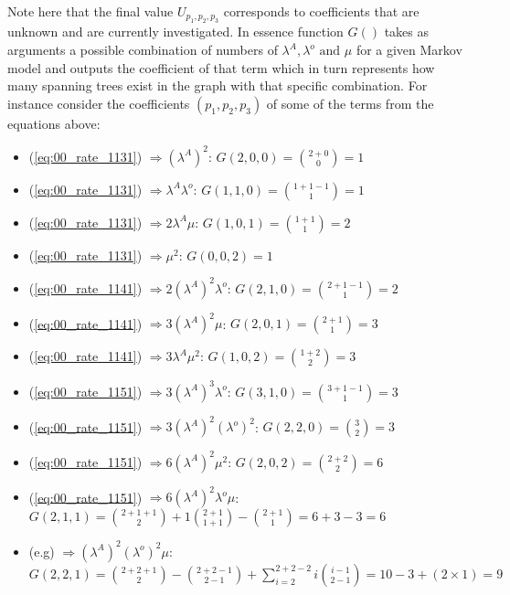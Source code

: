 Note here that the final value \(U_{p_1,p_2,p_3}\) corresponds to coefficients that are unknown and are currently investigated. 
In essence function \(G()\) takes as arguments a possible combination of numbers of \(\lambda^A, \lambda^o \text{ and } \mu \) for a given Markov model and outputs the coefficient of that term which in turn represents how many spanning trees exist in the graph with that specific combination. 
For instance consider the coefficients \((p_1,p_2,p_3)\) of some of the terms from the equations above:

\begin{multicols}{2}
    \begin{itemize}
        \item (\ref{eq:00_rate_1131}) \( \Rightarrow (\lambda^A)^2\): \(G(2,0,0) = \binom{2+0}{0} = 1\)
        \item (\ref{eq:00_rate_1131}) \( \Rightarrow \lambda^A \lambda^o\): \(G(1,1,0) = \binom{1+1-1}{1} = 1\)
        \item (\ref{eq:00_rate_1131}) \( \Rightarrow 2 \lambda^A \mu\): \(G(1,0,1) = \binom{1+1}{1} = 2\)
        \item (\ref{eq:00_rate_1131}) \( \Rightarrow \mu^2\): \(G(0,0,2) = 1\)
        \item (\ref{eq:00_rate_1141}) \( \Rightarrow 2(\lambda^A)^2 \lambda^o\): \(G(2,1,0) = \binom{2+1-1}{1} = 2\)
        \item (\ref{eq:00_rate_1141}) \( \Rightarrow 3(\lambda^A)^2 \mu\): \(G(2,0,1) = \binom{2+1}{1} = 3\)
        \item (\ref{eq:00_rate_1141}) \( \Rightarrow 3 \lambda^A \mu^2\): \(G(1,0,2) = \binom{1+2}{2} = 3\)
        \item (\ref{eq:00_rate_1151}) \( \Rightarrow 3 (\lambda^A)^3 \lambda^o\): \(G(3,1,0) = \binom{3+1-1}{1} = 3\)
        \item (\ref{eq:00_rate_1151}) \( \Rightarrow 3 (\lambda^A)^2 (\lambda^o)^2 \): \(G(2,2,0) = \binom{3}{2} = 3\)
        \item (\ref{eq:00_rate_1151}) \( \Rightarrow 6 (\lambda^A)^2 \mu ^ 2\): \(G(2,0,2) = \binom{2+2}{2} = 6\)
    \end{itemize}
\end{multicols}

\begin{itemize}
    \item (\ref{eq:00_rate_1151}) \( \Rightarrow 6 (\lambda^A)^2 \lambda^o \mu\): \(G(2,1,1) = \binom{2+1+1}{2} + 1\binom{2+1}{1+1} - \binom{2+1}{1} = 6 + 3 - 3 = 6\)
    \item \small{(e.g)} \( \Rightarrow (\lambda^A)^2 (\lambda^o)^2 \mu\): \(G(2,2,1) = \binom{2+2+1}{2} - \binom{2+2-1}{2-1} + \sum_{i=2}^{2+2-2} i\binom{i-1}{2-1} = 10 - 3 + (2 \times 1) = 9\)
\end{itemize}



